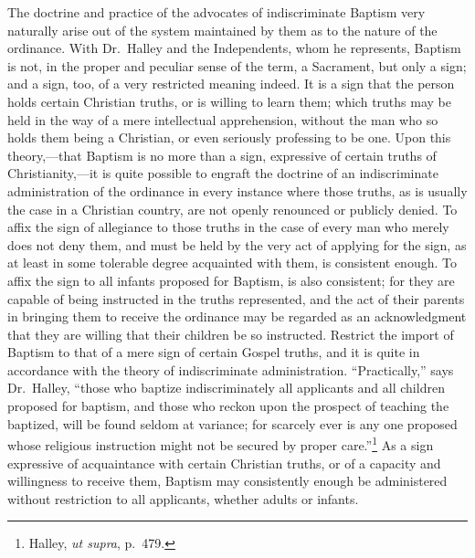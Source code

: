 \documentclass[]{book}
\begin{document}
The doctrine and practice of the advocates of indiscriminate Baptism very naturally arise out of the system maintained by them as to the nature of the ordinance. With Dr.~Halley and the Independents, whom he represents, Baptism is not, in the proper and peculiar sense of the term, a Sacrament, but only a sign; and a sign, too, of a very restricted meaning indeed. It is a sign that the person holds certain Christian truths, or is willing to learn them; which truths may be held in the way of a mere intellectual apprehension, without the man who so holds them being a Christian, or even seriously professing to be one. Upon this theory,---that Baptism is no more than a sign, expressive of certain truths of Christianity,---it is quite possible to engraft the doctrine of an indiscriminate administration of the ordinance in every instance where those truths, as is usually the case in a Christian country, are not openly renounced or publicly denied. To affix the sign of allegiance to those truths in the case of every man who merely does not deny them, and must be held by the very act of applying for the sign, as at least in some tolerable degree acquainted with them, is consistent enough. To affix the sign to all infants proposed for Baptism, is also consistent; for they are capable of being instructed in the truths represented, and the act of their parents in bringing them to receive the ordinance may be regarded as an acknowledgment that they are willing that their children be so instructed. Restrict the import of Baptism to that of a mere sign of certain Gospel truths, and it is quite in accordance with the theory of indiscriminate administration. ``Practically,'' says Dr.~Halley, ``those who baptize indiscriminately all applicants and all children proposed for baptism, and those who reckon upon the prospect of teaching the baptized, will be found seldom at variance; for scarcely ever is any one proposed whose religious instruction might not be secured by proper care.''\footnote{Halley, \emph{ut supra}, p.~479.} As a sign expressive of acquaintance with certain Christian truths, or of a capacity and willingness to receive them, Baptism may consistently enough be administered without restriction to all applicants, whether adults or infants.
\end{document}
